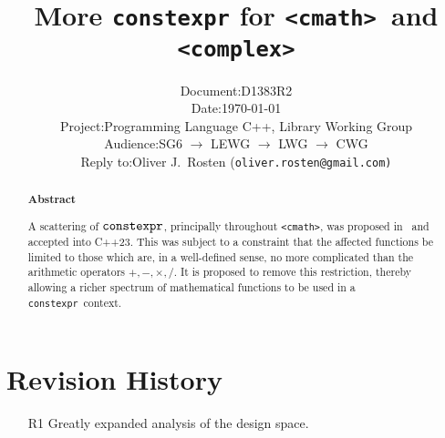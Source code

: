 \documentclass[prd,twocolumn,amsmath,amssymb,nofootinbib,eqsecnum]{revtex4-1}
\newcommand{\constexpr}{\code{constexpr}\xspace}
\newcommand{\code}[1]{{\tt #1}}
\newcommand{\header}[1]{{\tt <#1>}}
\newcommand{\cmath}{\header{cmath}}
\newcommand{\complex}{\header{complex}}
\newcommand{\Operators}{\ensuremath{+,-,\times,/}}
\begin{document}
\title{More \constexpr for \cmath\ and \complex}

\author{
\begin{tabular}{ll}
	Document: & D1383R2
\\
	Date: & \today
\\
	Project: & Programming Language C++, Library Working Group
\\
	Audience: & SG6 $\rightarrow$ LEWG $\rightarrow$ LWG $\rightarrow$ CWG
\\
	Reply to: & Oliver J.\ Rosten {(\tt oliver.rosten@gmail.com)}
\end{tabular}
}

\begin{abstract}

\begin{center} {\bf Abstract} \end{center}

A scattering of $\constexpr$, principally throughout \cmath, was proposed in~\cite{Rosten-constexpr} and accepted into C++23. This was subject to a constraint that the affected functions be limited to those which are, in a well-defined sense, no more complicated than the arithmetic operators \Operators. It is proposed to remove this restriction, thereby allowing a richer spectrum of mathematical functions to be used in a \constexpr\ context. 


\end{abstract}


\maketitle
\tableofcontents

\section{Revision History}

\begin{enumerate}
	\item[R1] Greatly expanded analysis of the design space.
\end{enumerate}
\end{document}
